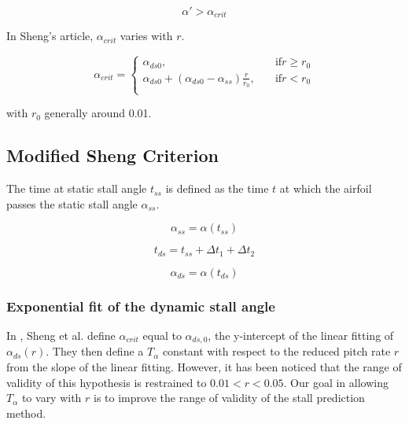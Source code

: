 \begin{equation}
\alpha' > \alpha_{crit}
\label{eq:stall_criterion}
\end{equation}

In Sheng's article, $\alpha_{crit}$ varies with $r$. 

\begin{equation}
\alpha_{crit} =
\begin{cases}
\alpha_{ds0}, &\quad \text{if} r \geq r_0 \\
\alpha_{ds0} + (\alpha_{ds0}-\alpha_{ss}) \frac{r}{r_0}, &\quad \text{if} r < r_0 \\
\end{cases}
\end{equation}

\noindent with $r_0$ generally around 0.01.

\subsection{Modified Sheng Criterion}

The time at static stall angle $t_{ss}$ is defined as the time $t$ at which the airfoil passes the static stall angle $\alpha_{ss}$.

\begin{equation}
\alpha_{ss} = \alpha(t_{ss})
\end{equation}

\begin{equation}
t_{ds} = t_{ss} +  \Delta t_1 + \Delta t_2
\end{equation}

\begin{equation}
\alpha_{ds} = \alpha(t_{ds})
\end{equation}

\subsubsection{Exponential fit of the dynamic stall angle}

In \autocite{sheng_new_2006},  Sheng et al. define $\alpha_{crit}$ equal to  $\alpha_{ds,0}$, the y-intercept of the linear fitting of $\alpha_{ds}(r)$. They then define a  $T_\alpha$ constant with respect to the reduced pitch rate $r$ from the slope of the linear fitting. However, it has been noticed that the range of validity of this hypothesis is restrained to $0.01<r<0.05$. Our goal in allowing $T_\alpha$ to vary with $r$ is to improve the range of validity of the stall prediction method. 

